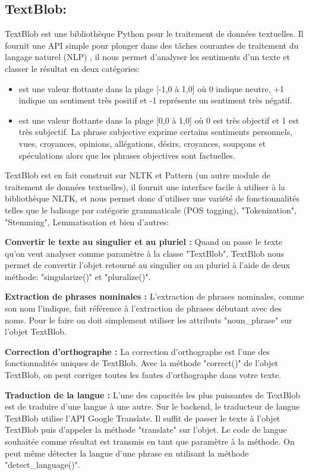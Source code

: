 \subsection{TextBlob:}
TextBlob est une bibliothèque Python pour le traitement de données textuelles. Il fournit une API simple pour plonger dans des tâches courantes de traitement du langage naturel (NLP) \cite{loria2018textblob}, il nous permet d'analyser les sentiments d'un texte et classer le résultat en deux catégories:
\begin{itemize}
    \item {} est une valeur flottante dans la plage [-1,0 à 1,0] où 0 indique neutre, +1 indique un sentiment très positif et -1 représente un sentiment très négatif.
    \item {} est une valeur flottante dans la plage [0,0 à 1,0] où 0 est très objectif et 1 est très subjectif. La phrase subjective exprime certains sentiments personnels, vues, croyances, opinions, allégations, désirs, croyances, soupçons et spéculations alors que les phrases objectives sont factuelles.
\end{itemize}

TextBlob est en fait construit sur NLTK et Pattern (un autre module de traitement de données textuelles), il fournit une interface facile à utiliser à la bibliothèque NLTK, et nous permet donc d'utiliser une variété de fonctionnalités telles que le balisage par catégorie grammaticale (POS tagging), "Tokenization", "Stemming", Lemmatisation et bien d'autres:

\textbf{Convertir le texte au singulier et au pluriel :}
Quand on passe le texte qu'on veut analyser comme paramètre à la classe "TextBlob", TextBlob nous permet de convertir l'objet retourné au singulier ou au pluriel à l'aide de deux méthode: "singularize()" et "pluralize()".

\textbf{Extraction de phrases nominales :}
L'extraction de phrases nominales, comme son nom l'indique, fait référence à l'extraction de phrases débutant avec des noms. Pour le faire on doit simplement utiliser les attributs "noun\_phrase" sur l'objet TextBlob.

\textbf{Correction d'orthographe :}
La correction d'orthographe est l'une des fonctionnalités uniques de TextBlob. Avec la méthode "correct()" de l'objet TextBlob, on peut corriger toutes les fautes d'orthographe dans votre texte.

\textbf{Traduction de la langue :}
L'une des capacités les plus puissantes de TextBlob est de traduire d'une langue à une autre. Sur le backend, le traducteur de langue TextBlob utilise l'API Google Translate. Il suffit de passer le texte à l'objet TextBlob puis d'appeler la méthode "translate" sur l'objet. Le code de langue souhaitée comme résultat est transmis en tant que paramètre à la méthode.
On peut même détecter la langue d'une phrase en utilisant la méthode "detect\_language()".

